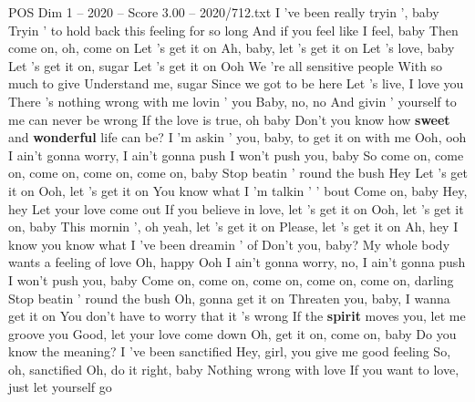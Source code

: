 \begin{textsample}{POS Dim 1 – 2020 – Score 3.00 – 2020/712.txt}  \label{ex:f1_pos_001}
I 've been really tryin ', baby Tryin ' to hold back this feeling for so long And if you feel like I feel, baby Then come on, oh, come on Let 's get it on Ah, baby, let 's get it on Let 's love, baby Let 's get it on, sugar Let 's get it on Ooh We 're all sensitive people With so much to give Understand me, sugar Since we got to be here Let 's live, I love you There 's nothing wrong with me lovin ' you Baby, no, no And givin ' yourself to me can never be wrong If the love is true, oh baby Don't you know how \textbf{sweet} and \textbf{wonderful} life can be?
I 'm askin ' you, baby, to get it on with me Ooh, ooh I ain't gonna worry, I ain't gonna push I won't push you, baby So come on, come on, come on, come on, come on, baby Stop beatin ' round the bush Hey Let 's get it on Ooh, let 's get it on You know what I 'm talkin ' ' bout Come on, baby Hey, hey Let your love come out If you believe in love, let 's get it on Ooh, let 's get it on, baby This mornin ', oh yeah, let 's get it on Please, let 's get it on Ah, hey I know you know what I 've been dreamin ' of Don't you, baby?
My whole body wants a feeling of love Oh, happy Ooh I ain't gonna worry, no, I ain't gonna push I won't push you, baby Come on, come on, come on, come on, come on, darling Stop beatin ' round the bush Oh, gonna get it on Threaten you, baby, I wanna get it on You don't have to worry that it 's wrong If the \textbf{spirit} moves you, let me groove you Good, let your love come down Oh, get it on, come on, baby Do you know the meaning?
I 've been sanctified Hey, girl, you give me good feeling So, oh, sanctified Oh, do it right, baby Nothing wrong with love If you want to love, just let yourself go

\end{textsample}

